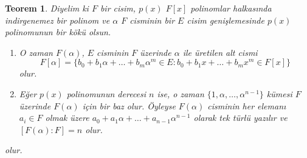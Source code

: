 \documentclass{article}
\newtheorem{thm}{Teorem}[section]
\theoremstyle{definition}
\theoremstyle{remark}
\begin{document}
			\begin{thm}\label{3.8}
			    Diyelim ki $F$ bir cisim, $p(x)$ $F[x]$ polinomlar halkasında indirgenemez bir polinom ve $\alpha$ $F$ cisminin bir $E$ cisim genişlemesinde $p(x)$ polinomunun bir kökü olsun.
				\begin{enumerate}
				\renewcommand{\labelenumi}{(\roman{enumi})}
				    \item O zaman $F(\alpha)$, $E$ cisminin $F$ üzerinde $\alpha$ ile üretilen alt cismi
					\begin{equation*}
					    F[\alpha] = \{b_0 + b_1\alpha + \dots + b_{m}\alpha^m \in E : b_0 + b_1x + \dots + b_{m}x^m \in F[x] \}
					\end{equation*}
					olur.
					\item Eğer $p(x)$ polinomunun derecesi $n$ ise, o zaman $\{1, \alpha, \dots, \alpha^{n - 1}\}$ kümesi $F$ üzerinde $F(\alpha)$ için bir baz olur. Öyleyse $F(\alpha)$ cisminin her elemanı $a_i \in F$ olmak üzere $a_0 + a_1\alpha + \dots + a_{n - 1}\alpha^{n - 1}$ olarak tek türlü yazılır ve $[F(\alpha):F] = n$ olur.
				\end{enumerate}
				olur.
			\end{thm}
			
\end{document}
